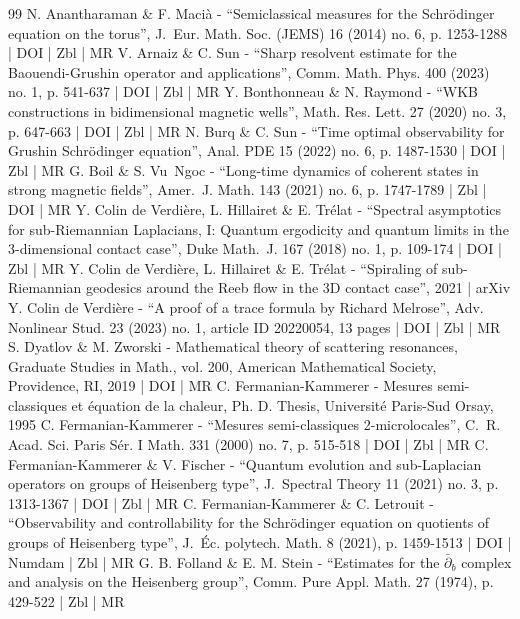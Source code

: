 \begin{thebibliography}{99}
N. Anantharaman \& F. Macià - “Semiclassical measures for the Schrödinger equation on the torus”, J. Eur. Math. Soc. (JEMS) 16 (2014) no. 6, p. 1253-1288 | DOI | Zbl | MR
V. Arnaiz \& C. Sun - “Sharp resolvent estimate for the Baouendi-Grushin operator and applications”, Comm. Math. Phys. 400 (2023) no. 1, p. 541-637 | DOI | Zbl | MR
Y. Bonthonneau \& N. Raymond - “WKB constructions in bidimensional magnetic wells”, Math. Res. Lett. 27 (2020) no. 3, p. 647-663 | DOI | Zbl | MR
N. Burq \& C. Sun - “Time optimal observability for Grushin Schrödinger equation”, Anal. PDE 15 (2022) no. 6, p. 1487-1530 | DOI | Zbl | MR
G. Boil \& S. Vu Ngoc - “Long-time dynamics of coherent states in strong magnetic fields”, Amer. J. Math. 143 (2021) no. 6, p. 1747-1789 | Zbl | DOI | MR
Y. Colin de Verdière, L. Hillairet \& E. Trélat - “Spectral asymptotics for sub-Riemannian Laplacians, I: Quantum ergodicity and quantum limits in the 3-dimensional contact case”, Duke Math. J. 167 (2018) no. 1, p. 109-174 | DOI | Zbl | MR
Y. Colin de Verdière, L. Hillairet \& E. Trélat - “Spiraling of sub-Riemannian geodesics around the Reeb flow in the 3D contact case”, 2021 | arXiv
Y. Colin de Verdière - “A proof of a trace formula by Richard Melrose”, Adv. Nonlinear Stud. 23 (2023) no. 1, article ID 20220054, 13 pages | DOI | Zbl | MR
S. Dyatlov \& M. Zworski - Mathematical theory of scattering resonances, Graduate Studies in Math., vol. 200, American Mathematical Society, Providence, RI, 2019 | DOI | MR
C. Fermanian-Kammerer - Mesures semi-classiques et équation de la chaleur, Ph. D. Thesis, Université Paris-Sud Orsay, 1995
C. Fermanian-Kammerer - “Mesures semi-classiques 2-microlocales”, C. R. Acad. Sci. Paris Sér. I Math. 331 (2000) no. 7, p. 515-518 | DOI | Zbl | MR
C. Fermanian-Kammerer \& V. Fischer - “Quantum evolution and sub-Laplacian operators on groups of Heisenberg type”, J. Spectral Theory 11 (2021) no. 3, p. 1313-1367 | DOI | Zbl | MR
C. Fermanian-Kammerer \& C. Letrouit - “Observability and controllability for the Schrödinger equation on quotients of groups of Heisenberg type”, J. Éc. polytech. Math. 8 (2021), p. 1459-1513 | DOI | Numdam | Zbl | MR
G. B. Folland \& E. M. Stein - “Estimates for the $\bar{\partial }_{b}$ complex and analysis on the Heisenberg group”, Comm. Pure Appl. Math. 27 (1974), p. 429-522 | Zbl | MR

\end{thebibliography}
